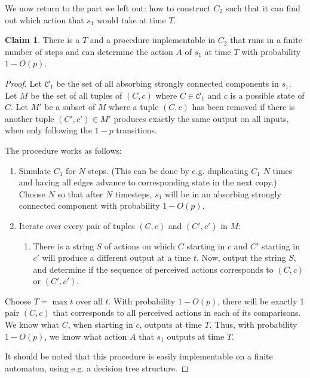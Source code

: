 \documentclass[11pt]{amsart}
\theoremstyle{definition}
\newtheorem{claim}[theorem]{Claim}
\theoremstyle{remark}
\begin{document}
      We now return to the part we left out: how to construct $C_2$ such that it can find out which action that $s_1$ would take at time $T$.

      \begin{claim}
        There is a $T$ and a procedure implementable in $C_2$ that runs in a finite number of steps and can determine the action $A$ of $s_1$ at time $T$ with probability $1 - O(p)$.
      \end{claim}

      \begin{proof}
          Let $\mathcal{C}_1$ be the set of all absorbing strongly connected components in $s_1$.
           Let $M$ be the set of all tuples of $(C, c)$ where $C \in \mathcal{C}_1$ and $c$ is a possible state of $C$. Let $M'$ be a subset of $M$ where a tuple $(C, c)$ has been removed if there is another tuple $(C', c') \in M'$ produces exactly the same output on all inputs, when only following the $1-p$ transitions.

        The procedure works as follows:
        \begin{enumerate}
          \item Simulate $C_1$ for $N$ steps. (This can be done by e.g. duplicating $C_1$ $N$ times and having all edges advance to corresponding state in the next copy.) Choose $N$ so that after $N$ timesteps, $s_1$ will be in an absorbing strongly connected component with probability $1 - O(p)$. 
          \item Iterate over every pair of tuples $(C,c)$ and $(C', c')$ in $M$:
          \begin{enumerate}
            \item There is a string $S$ of actions on which $C$ starting in $c$ and $C'$ starting in $c'$ will produce a different output at a time $t$. Now, output the string $S$, and determine if the sequence of perceived actions corresponds to $(C,c)$ or $(C', c')$.
          \end{enumerate}
        \end{enumerate}
        Choose $T = \max t$ over all $t$.
         With probability $1 - O(p)$, there will be exactly 1 pair $(C, c)$ that corresponds to all perceived actions in each of its comparisons. We know what $C$, when starting in $c$, outputs at time $T$. Thus, with probability $1 - O(p)$, we know what action $A$ that $s_1$ outputs at time $T$.

        It should be noted that this procedure is easily implementable on a finite automaton, using e.g. a decision tree structure.
      \end{proof}
\end{document}
